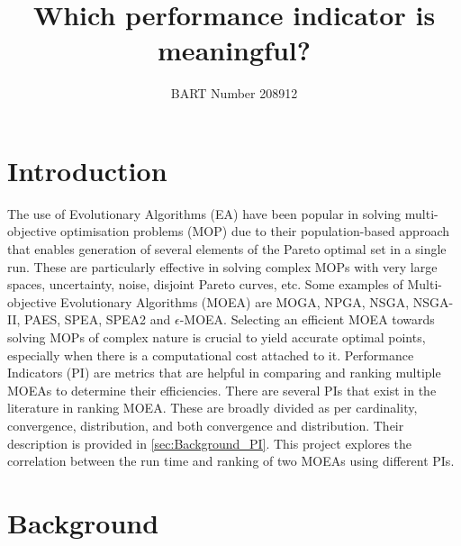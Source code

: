 \documentclass[sigconf,nonacm]{acmart}
\begin{document}
\title{Which performance indicator is meaningful?}
\author{BART Number 208912}

\begin{abstract}
	
\end{abstract}

\maketitle

\section{Introduction}
The use of Evolutionary Algorithms (EA) have been popular in solving multi-objective optimisation problems (MOP) due to their population-based approach that enables generation of several elements of the Pareto optimal set in a single run. These are particularly effective in solving complex MOPs with very large spaces, uncertainty, noise, disjoint Pareto curves, etc. Some examples of Multi-objective Evolutionary Algorithms (MOEA) are MOGA, NPGA, NSGA, NSGA-II, PAES, SPEA, SPEA2 and $\epsilon$-MOEA\cite{moea2007, deb2002}. Selecting an efficient MOEA towards solving MOPs of complex nature is crucial to yield accurate optimal points, especially when there is a computational cost attached to it. Performance Indicators (PI) are metrics that are helpful in comparing and ranking multiple MOEAs to determine their efficiencies. There are several PIs that exist in the literature in ranking MOEA. These are broadly divided as per cardinality, convergence, distribution, and both convergence and distribution. Their description is provided in \autoref{sec:Background_PI}. This project explores the correlation between the run time and ranking of two MOEAs using different PIs.

\section{Background} \label{sec:Background}
\end{document}

